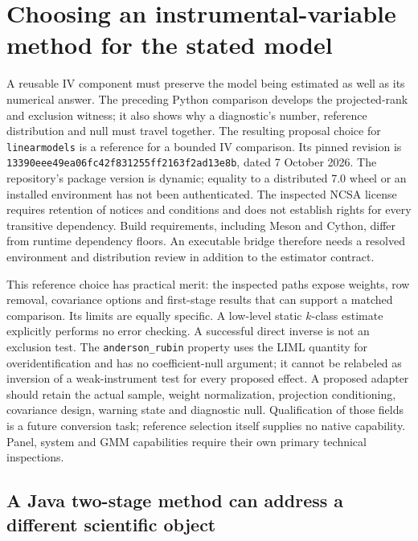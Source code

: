 \section{Choosing an instrumental-variable method for the stated model}
\label{exec23:iv-choice}

A reusable IV component must preserve the model being estimated as well as its
numerical answer. The preceding Python comparison develops the projected-rank
and exclusion witness; it also shows why a diagnostic's number, reference
distribution and null must travel together. The resulting proposal choice for
\texttt{linearmodels} is a reference for a bounded IV comparison. Its pinned
revision is \texttt{13390eee49ea06fc42f831255ff2163f2ad13e8b}, dated
7 October 2026. The repository's package version is dynamic; equality to a
distributed 7.0 wheel or an installed environment has not been authenticated.
The inspected NCSA license requires retention of notices and conditions and
does not establish rights for every transitive dependency. Build requirements,
including Meson and Cython, differ from runtime dependency floors. An executable
bridge therefore needs a resolved environment and distribution review in
addition to the estimator contract.~\citep{exec22_linearmodels_reuse}

This reference choice has practical merit: the inspected paths expose weights,
row removal, covariance options and first-stage results that can support a
matched comparison. Its limits are equally specific. A low-level static
$k$-class estimate explicitly performs no error checking. A successful direct
inverse is not an exclusion test. The \texttt{anderson\_rubin} property uses
the LIML quantity for overidentification and has no coefficient-null argument;
it cannot be relabeled as inversion of a weak-instrument test for every
proposed effect. A proposed adapter should retain the actual sample, weight
normalization, projection conditioning, covariance design, warning state and
diagnostic null. Qualification of those fields is a future conversion task;
reference selection itself supplies no native capability. Panel, system and
GMM capabilities require their own primary technical inspections.
\citep{exec22_linearmodels_reuse}

\subsection{A Java two-stage method can address a different scientific object}
\label{exec23:iv-java}

